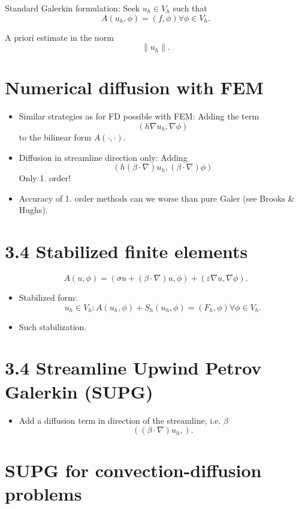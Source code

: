 \documentclass[
	a4paper,
	11pt,
	oneside
]{scrreprt}
\theoremstyle{definition}
\begin{document}
Standard Galerkin formulation: Seek $u_{h}\in V_{h}$ such that \[ A\left(u_{h},\phi\right)=\left(f,\phi\right)\forall\phi\in V_{h}. \]

A priori estimate in the norm \[\|u_h\|. \]

\section{Numerical diffusion with FEM}

\begin{itemize}
	\item Similar strategies as for FD possible with FEM: Adding the term \[ \left(h\nabla u_{h},\nabla\phi\right) \] to the bilinear form $A\left(\cdot,\cdot\right)$.
	\item Diffusion in streamline direction only: Adding \[ \left(h\left(\beta\cdot\nabla\right)u_{h},\left(\beta\cdot\nabla\right)\phi\right)\] Only 1. order!
\item Accuracy of 1. order methods can we worse than pure Galer (see Brooks \& Hughs).
\end{itemize}

\section{3.4 Stabilized finite elements}

\[ A\left(u,\phi\right)=\left(\sigma u+\left(\beta\cdot\nabla\right)u,\phi\right)+\left(\varepsilon\nabla u,\nabla \phi\right). \]

\begin{itemize}
	\item Stabilized form: \[ u_{h}\in V_{h}: A\left(u_{h},\phi\right)+S_{h}\left(u_{h},\phi\right)=\left(F_{h},\phi\right)\forall\phi\in V_{h}. \]
	\item Such stabilization.
\end{itemize}

\section{3.4 Streamline Upwind Petrov Galerkin (SUPG)}

\begin{itemize}
	\item Add a diffusion term in direction of the streamline, i.e. $\beta$ \[ \left(\left(\beta\cdot\nabla\right)u_{h},\right). \]
\end{itemize}

\section{SUPG for convection-diffusion problems}
\end{document}
